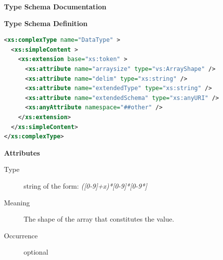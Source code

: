 \documentclass[11pt,a4paper]{ivoa}
\begin{document}
\begin{generated}
\begingroup
        \renewcommand*\descriptionlabel[1]{%
        \hbox to 5.5em{\emph{#1}\hfil}}\vspace{2ex}\noindent\textbf{ Type Schema Documentation}



\vspace{1ex}\noindent\textbf{ Type Schema Definition}

\begin{lstlisting}[language=XML,basicstyle=\footnotesize]
<xs:complexType name="DataType" >
  <xs:simpleContent >
    <xs:extension base="xs:token" >
      <xs:attribute name="arraysize" type="vs:ArrayShape" />
      <xs:attribute name="delim" type="xs:string" />
      <xs:attribute name="extendedType" type="xs:string" />
      <xs:attribute name="extendedSchema" type="xs:anyURI" />
      <xs:anyAttribute namespace="##other" />
    </xs:extension>
  </xs:simpleContent>
</xs:complexType>
\end{lstlisting}

\vspace{0.5ex}\noindent\textbf{ Attributes}

\begingroup\small\begin{bigdescription}
\item[arraysize]
\begin{description}
\item[Type] string of the form: \emph{([0-9]+x)*[0-9]*[0-9*]}
\item[Meaning] The shape of the array that constitutes the value.
\item[Occurrence] optional


\end{description}
\end{bigdescription}
\end{generated}
\end{document}
